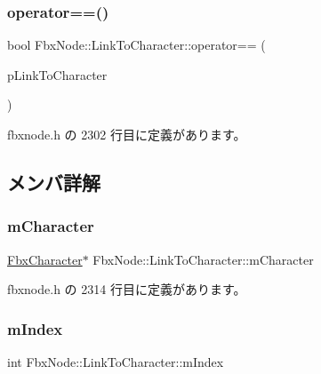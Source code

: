 \subsubsection{\texorpdfstring{operator==()}{operator==()}}
{\footnotesize\ttfamily bool Fbx\+Node\+::\+Link\+To\+Character\+::operator== (\begin{DoxyParamCaption}\item[{\hyperlink{class_fbx_node_1_1_link_to_character}{Link\+To\+Character} \&}]{p\+Link\+To\+Character }\end{DoxyParamCaption})\hspace{0.3cm}{\ttfamily [inline]}}



 fbxnode.\+h の 2302 行目に定義があります。



\subsection{メンバ詳解}
\mbox{\label{class_fbx_node_1_1_link_to_character_adc1f08186e1643f6257a39487c7fff1a}} 
\subsubsection{\texorpdfstring{m\+Character}{mCharacter}}
{\footnotesize\ttfamily \hyperlink{class_fbx_character}{Fbx\+Character}$\ast$ Fbx\+Node\+::\+Link\+To\+Character\+::m\+Character}



 fbxnode.\+h の 2314 行目に定義があります。

\mbox{\label{class_fbx_node_1_1_link_to_character_a67864508b5c8a7ee952d5d28d46e3853}} 
\subsubsection{\texorpdfstring{m\+Index}{mIndex}}
{\footnotesize\ttfamily int Fbx\+Node\+::\+Link\+To\+Character\+::m\+Index}



